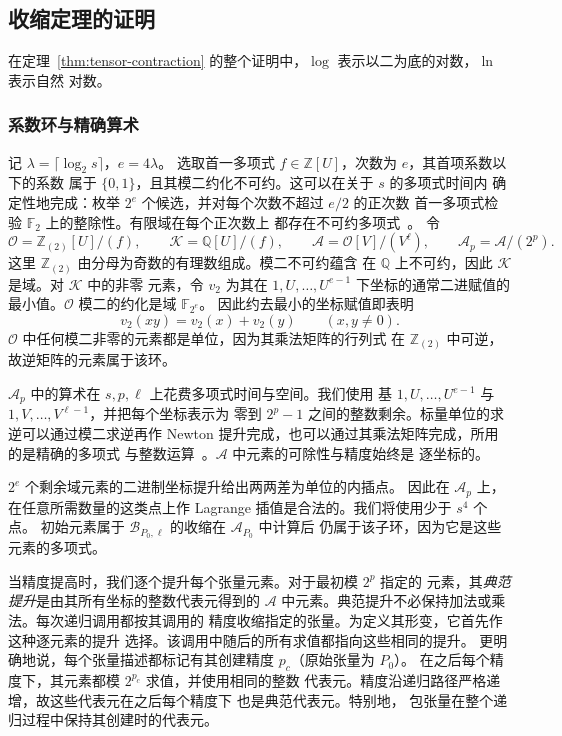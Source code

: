 \subsection{收缩定理的证明}
\label{app:tensor}

在定理~\ref{thm:tensor-contraction} 的整个证明中，$\log$ 表示以二为底的对数，$\ln$ 表示自然
对数。

\subsubsection{系数环与精确算术}
\label{subsec:tensor-arithmetic}

记 $\lambda=\lceil\log_2 s\rceil$，$e=4\lambda$。
选取首一多项式 $f\in\mathbb Z[U]$，次数为 $e$，其首项系数以下的系数
属于 $\{0,1\}$，且其模二约化不可约。这可以在关于 $s$ 的多项式时间内
确定性地完成：枚举 $2^e$ 个候选，并对每个次数不超过 $e/2$ 的正次数
首一多项式检验 $\mathbb F_2$ 上的整除性。有限域在每个正次数上
都存在不可约多项式~\cite{vzGG13}。
令
\[
 \mathcal O=\mathbb Z_{(2)}[U]/(f),\qquad
 \mathcal K=\mathbb Q[U]/(f),\qquad
 \mathcal A=\mathcal O[V]/(V^\ell),\qquad
 \mathcal A_p=\mathcal A/(2^p).
\]
这里 $\mathbb Z_{(2)}$ 由分母为奇数的有理数组成。模二不可约蕴含
在 $\mathbb Q$ 上不可约，因此 $\mathcal K$ 是域。对 $\mathcal K$ 中的非零
元素，令 $v_2$ 为其在 $1,U,\ldots,U^{e-1}$ 下坐标的通常二进赋值的
最小值。$\mathcal O$ 模二的约化是域 $\mathbb F_{2^e}$。
因此约去最小的坐标赋值即表明
\[
 v_2(xy)=v_2(x)+v_2(y)\qquad(x,y\ne0).
\]
$\mathcal O$ 中任何模二非零的元素都是单位，因为其乘法矩阵的行列式
在 $\mathbb Z_{(2)}$ 中可逆，故逆矩阵的元素属于该环。

$\mathcal A_p$ 中的算术在 $s,p,\ell$ 上花费多项式时间与空间。我们使用
基 $1,U,\ldots,U^{e-1}$ 与 $1,V,\ldots,V^{\ell-1}$，并把每个坐标表示为
零到 $2^p-1$ 之间的整数剩余。标量单位的求逆可以通过模二求逆再作
Newton 提升完成，也可以通过其乘法矩阵完成，所用的是精确的多项式
与整数运算~\cite{vzGG13}。$\mathcal A$ 中元素的可除性与精度始终是
逐坐标的。

$2^e$ 个剩余域元素的二进制坐标提升给出两两差为单位的内插点。
因此在 $\mathcal A_p$ 上，在任意所需数量的这类点上作 Lagrange
插值是合法的。我们将使用少于 $s^4$ 个点。
初始元素属于 $\mathcal B_{P_0,\ell}$ 的收缩在 $\mathcal A_{P_0}$ 中计算后
仍属于该子环，因为它是这些元素的多项式。

当精度提高时，我们逐个提升每个张量元素。对于最初模 $2^p$ 指定的
元素，其\emph{典范提升}是由其所有坐标的整数代表元得到的 $\mathcal A$
中元素。典范提升不必保持加法或乘法。每次递归调用都按其调用的
精度收缩指定的张量。为定义其形变，它首先作这种逐元素的提升
选择。该调用中随后的所有求值都指向这些相同的提升。
更明确地说，每个张量描述都标记有其创建精度 $p_c$（原始张量为 $P_0$）。
在之后每个精度下，其元素都模 $2^{p_c}$ 求值，并使用相同的整数
代表元。精度沿递归路径严格递增，故这些代表元在之后每个精度下
也是典范代表元。特别地，
包张量在整个递归过程中保持其创建时的代表元。

